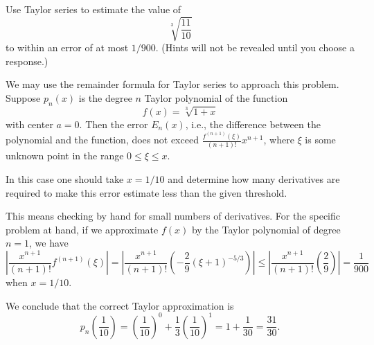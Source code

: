 \documentclass{ximera}
\begin{document}
\begin{question}%

Use Taylor series to estimate the value of
\[\sqrt[3]{\frac{11}{10}}\] to within an error of at most \(1/900\).
(Hints will not be revealed until you choose a response.)
\begin{multiplechoice}
\end{multiplechoice}
\begin{feedback}
We may use the remainder formula for Taylor series to approach this problem.
Suppose \(p_n(x)\) is the degree \(n\) Taylor polynomial of the function
\[ f(x) = \sqrt[3]{1+x}\]
with center \(a=0\). Then the error \(E_n(x)\), i.e., the difference between the polynomial and the function, does not exceed \(\frac{f^{(n+1)}(\xi)}{(n+1)!}x^{n+1}\), where \(\xi\) is some unknown point  in the range \(0 \leq \xi \leq x\). \begin{hint} In this case one should take \(x = 1/10\) and determine how many derivatives are required to make this error estimate less than the given threshold. \begin{hint} This means checking by hand for small numbers of derivatives. For the specific problem at hand, if we approximate \(f(x)\) by the Taylor polynomial of degree \( n = 1\), we have 
\[ \left| \frac{x^{n+1} }{(n+1)!} f^{(n+1)}(\xi) \right| = \left| \frac{x^{n+1}}{(n+1)!} \left( -\frac{2}{9} (\xi+1)^{-5/3} \right) \right| \leq \left| \frac{x^{n+1}}{(n+1)!} \left( \frac{2}{9} \right) \right| = \frac{1}{900} \] when \(x = 1/10\). \begin{hint}
We conclude that the correct Taylor approximation is
\[ p_n \left( \frac{1}{10}\right) =  \left(\frac{1}{10}\right)^{0} + \frac{1}{3}\left(\frac{1}{10}\right)^{1} =  1 + \frac{1}{30} = \frac{31}{30}.\]
\end{hint} \end{hint} \end{hint}
\end{feedback}

\end{question}
\end{document}
